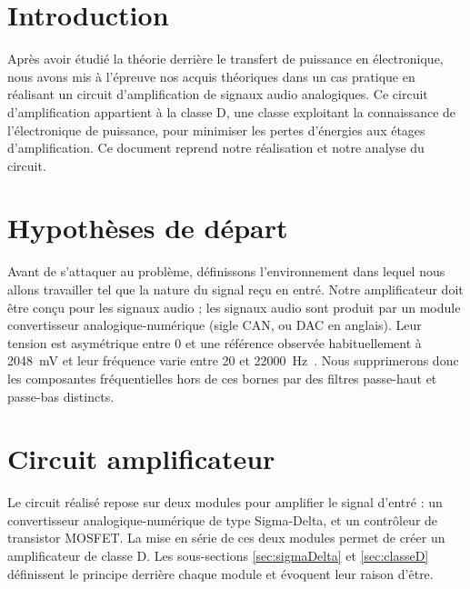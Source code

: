 \documentclass[10pt, oneside, a4paper]{article}
\begin{document}
\tableofcontents
\newpage

\section*{Introduction}
Après avoir étudié la théorie derrière le transfert de puissance en électronique,
nous avons mis à l'épreuve nos acquis théoriques dans un cas pratique en réalisant un circuit d'amplification de signaux audio analogiques.
Ce circuit d'amplification appartient à la classe D, une classe exploitant la connaissance de l'électronique de puissance, pour minimiser les pertes d'énergies aux étages d'amplification.
Ce document reprend notre réalisation et notre analyse du circuit.


\section{Hypothèses de départ}
    \label{sec:hypothese}
Avant de s'attaquer au problème, définissons l'environnement dans lequel nous allons travailler tel que la nature du signal reçu en entré.
Notre amplificateur doit être conçu pour les signaux audio ;
les signaux audio sont produit par un module convertisseur analogique-numérique (sigle CAN, ou DAC en anglais).
Leur tension est asymétrique entre \num{0} et une référence observée habituellement à \SI{2048}{\milli\volt} et leur fréquence varie entre \num{20} et \SI{22000}{\hertz}~\cite{heffner2007hearing}.
Nous supprimerons donc les composantes fréquentielles hors de ces bornes par des filtres passe-haut et passe-bas distincts.


\section{Circuit amplificateur}
Le circuit réalisé repose sur deux modules pour amplifier le signal d'entré :
un convertisseur analogique-numérique de type Sigma-Delta, et un contrôleur de transistor MOSFET.
La mise en série de ces deux modules permet de créer un amplificateur de classe D.
Les sous-sections \ref{sec:sigmaDelta} et \ref{sec:classeD} définissent le principe derrière chaque module et évoquent leur raison d'être.
\end{document}
